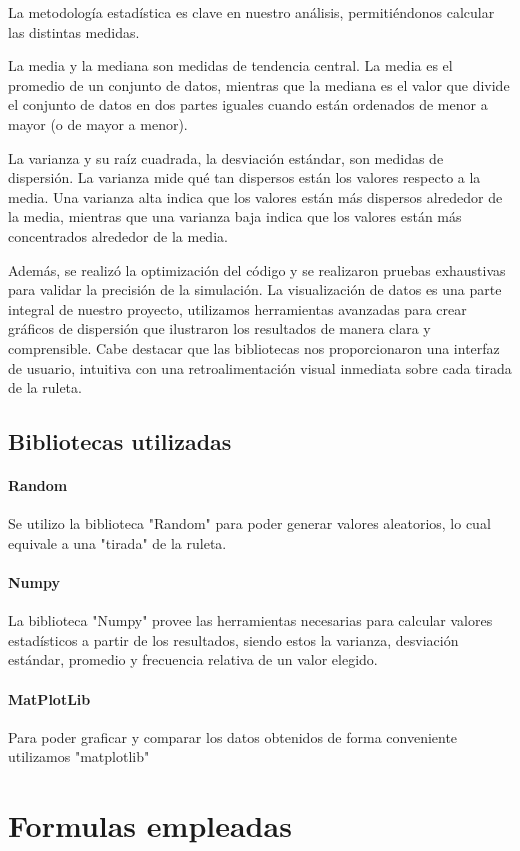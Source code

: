 \documentclass{article}
\begin{document}
La metodología estadística es clave en nuestro análisis, 
permitiéndonos calcular las distintas medidas.  

La media y la mediana son medidas de tendencia central. La media es el promedio de un conjunto de datos, mientras que la mediana es el valor que divide el conjunto de datos en dos partes iguales cuando están ordenados de menor a mayor (o de mayor a menor).

La varianza y su raíz cuadrada, la desviación estándar, son medidas de dispersión. La varianza mide qué tan dispersos están los valores respecto a la media. Una varianza alta indica que los valores están más dispersos alrededor de la media, mientras que una varianza baja indica que los valores están más concentrados alrededor de la media.

Además, se realizó la optimización del código y se realizaron pruebas exhaustivas para validar la precisión de la simulación.
La visualización de datos es una parte integral de nuestro proyecto,
utilizamos herramientas avanzadas para crear gráficos de 
dispersión que ilustraron los resultados de manera clara 
y comprensible. Cabe destacar que las bibliotecas nos proporcionaron una interfaz de usuario, intuitiva con una
retroalimentación visual inmediata sobre cada tirada 
de la ruleta.

\subsection{Bibliotecas utilizadas}
\paragraph{Random}
Se utilizo la biblioteca "Random" para poder generar valores aleatorios, lo cual equivale a una "tirada" de la ruleta.
\paragraph{Numpy}
La biblioteca "Numpy" provee las herramientas necesarias para calcular valores estadísticos a partir de los resultados, siendo estos la varianza, desviación estándar, promedio y frecuencia relativa de un valor elegido.
\paragraph{MatPlotLib}
Para poder graficar y comparar los datos obtenidos de forma conveniente utilizamos "matplotlib" 

\section{Formulas empleadas}
\end{document}

